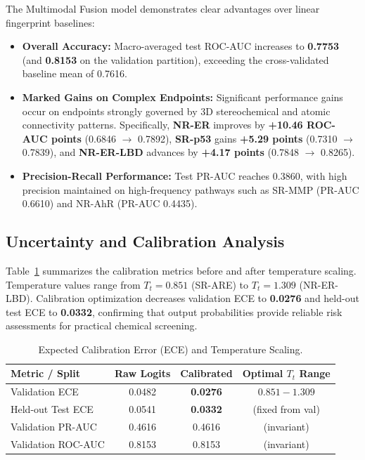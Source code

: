 \documentclass[conference]{IEEEtran}
\begin{document}
The Multimodal Fusion model demonstrates clear advantages over linear fingerprint baselines:
\begin{itemize}
    \item \textbf{Overall Accuracy:} Macro-averaged test ROC-AUC increases to \textbf{0.7753} (and \textbf{0.8153} on the validation partition), exceeding the cross-validated baseline mean of 0.7616.
    \item \textbf{Marked Gains on Complex Endpoints:} Significant performance gains occur on endpoints strongly governed by 3D stereochemical and atomic connectivity patterns. Specifically, \textbf{NR-ER} improves by \textbf{+10.46 ROC-AUC points} (0.6846 $\to$ 0.7892), \textbf{SR-p53} gains \textbf{+5.29 points} (0.7310 $\to$ 0.7839), and \textbf{NR-ER-LBD} advances by \textbf{+4.17 points} (0.7848 $\to$ 0.8265).
    \item \textbf{Precision-Recall Performance:} Test PR-AUC reaches 0.3860, with high precision maintained on high-frequency pathways such as SR-MMP (PR-AUC 0.6610) and NR-AhR (PR-AUC 0.4435).
\end{itemize}

\subsection{Uncertainty and Calibration Analysis}
Table~\ref{tab:calibration} summarizes the calibration metrics before and after temperature scaling. Temperature values range from $T_t = 0.851$ (SR-ARE) to $T_t = 1.309$ (NR-ER-LBD). Calibration optimization decreases validation ECE to \textbf{0.0276} and held-out test ECE to \textbf{0.0332}, confirming that output probabilities provide reliable risk assessments for practical chemical screening.

\begin{table}[t]
\centering\footnotesize
\setlength{\tabcolsep}{3.5pt}
\caption{Expected Calibration Error (ECE) and Temperature Scaling.}\label{tab:calibration}
\begin{tabular}{@{}lccc@{}}
\toprule
Metric / Split & Raw Logits & Calibrated & Optimal $T_t$ Range \\
\midrule
Validation ECE & 0.0482 & \textbf{0.0276} & $0.851 - 1.309$ \\
Held-out Test ECE & 0.0541 & \textbf{0.0332} & (fixed from val) \\
Validation PR-AUC & 0.4616 & 0.4616 & (invariant) \\
Validation ROC-AUC & 0.8153 & 0.8153 & (invariant) \\
\bottomrule
\end{tabular}
\end{table}
\end{document}
